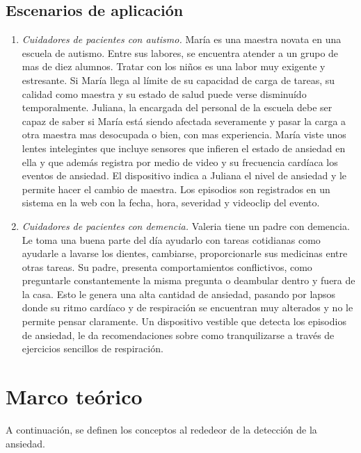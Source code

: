 \documentclass[letterpaper,12pt]{cicese}
\begin{document}
			\section{Escenarios de aplicaci\'on}
				\begin{enumerate}
					\item \emph{Cuidadores de pacientes con autismo.}
					Mar\'ia es una maestra novata en una escuela de autismo. Entre sus labores, se encuentra
					atender a un grupo de mas de diez alumnos. Tratar con los ni\~nos es una labor muy exigente y estresante. Si Mar\'ia llega al l\'imite de su capacidad
					de carga de tareas, su calidad como maestra y su estado de salud puede verse disminu\'ido temporalmente. Juliana, la encargada del personal de la
					escuela debe ser capaz de saber si Mar\'ia est\'a siendo afectada severamente y pasar la carga a otra maestra mas desocupada o bien, con mas experiencia. Mar\'ia
					viste unos lentes intelegintes que incluye sensores que infieren el estado de ansiedad en ella y que adem\'as registra por medio de video y su
					frecuencia card\'iaca los eventos de ansiedad. El dispositivo indica a Juliana el nivel de ansiedad y le permite hacer el cambio de maestra. Los episodios son registrados
					en un sistema en la web con la fecha, hora, severidad y videoclip del evento. 	
				\item \emph{Cuidadores de pacientes con demencia.}
						Valeria tiene un padre con demencia. Le toma una buena parte del d\'ia ayudarlo
						con tareas cotidianas como ayudarle a lavarse los dientes, cambiarse, proporcionarle sus medicinas entre
						otras tareas. Su padre, presenta comportamientos conflictivos, como preguntarle constantemente la misma pregunta o deambular dentro y fuera de la casa. Esto le genera una alta cantidad de ansiedad, pasando por lapsos donde su ritmo card\'iaco y de respiraci\'on se encuentran muy alterados y no le permite pensar
						claramente. Un dispositivo vestible que detecta los episodios de ansiedad, le da recomendaciones sobre como tranquilizarse a trav\'es de
						ejercicios sencillos de respiraci\'on.
				\end{enumerate}

		\chapter{Marco te\'orico} 
			A continuaci\'on, se definen los conceptos al rededeor de la detecci\'on de la ansiedad.
				
\end{document}
